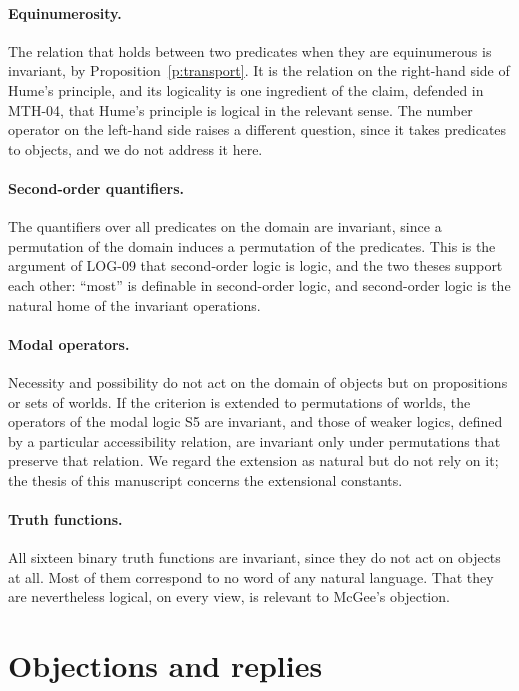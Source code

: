 \documentclass{situationist-preprint}
\begin{document}
\paragraph{Equinumerosity.} The relation that holds between two predicates when they are equinumerous is invariant, by Proposition~\ref{p:transport}. It is the relation on the right-hand side of Hume's principle, and its logicality is one ingredient of the claim, defended in MTH-04, that Hume's principle is logical in the relevant sense. The number operator on the left-hand side raises a different question, since it takes predicates to objects, and we do not address it here.

\paragraph{Second-order quantifiers.} The quantifiers over all predicates on the domain are invariant, since a permutation of the domain induces a permutation of the predicates. This is the argument of LOG-09 that second-order logic is logic, and the two theses support each other: \enquote{most} is definable in second-order logic, and second-order logic is the natural home of the invariant operations.

\paragraph{Modal operators.} Necessity and possibility do not act on the domain of objects but on propositions or sets of worlds. If the criterion is extended to permutations of worlds, the operators of the modal logic S5 are invariant, and those of weaker logics, defined by a particular accessibility relation, are invariant only under permutations that preserve that relation. We regard the extension as natural but do not rely on it; the thesis of this manuscript concerns the extensional constants.

\paragraph{Truth functions.} All sixteen binary truth functions are invariant, since they do not act on objects at all. Most of them correspond to no word of any natural language. That they are nevertheless logical, on every view, is relevant to McGee's objection.

\section{Objections and replies}\label{s:obj}
\end{document}
